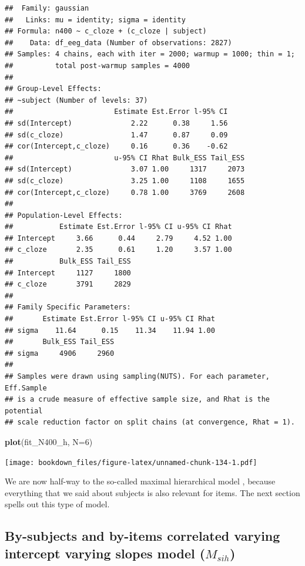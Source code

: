 \documentclass[12pt,]{krantz}
\newenvironment{Shaded}{\begin{snugshade}}{\end{snugshade}}
\newcommand{\DataTypeTok}[1]{\textcolor[rgb]{0.13,0.29,0.53}{#1}}
\newcommand{\DecValTok}[1]{\textcolor[rgb]{0.00,0.00,0.81}{#1}}
\newcommand{\KeywordTok}[1]{\textcolor[rgb]{0.13,0.29,0.53}{\textbf{#1}}}
\newcommand{\NormalTok}[1]{#1}
\theoremstyle{definition}
\theoremstyle{definition}
\theoremstyle{definition}
\theoremstyle{remark}
\begin{document}
\begin{verbatim}
##  Family: gaussian 
##   Links: mu = identity; sigma = identity 
## Formula: n400 ~ c_cloze + (c_cloze | subject) 
##    Data: df_eeg_data (Number of observations: 2827) 
## Samples: 4 chains, each with iter = 2000; warmup = 1000; thin = 1;
##          total post-warmup samples = 4000
## 
## Group-Level Effects: 
## ~subject (Number of levels: 37) 
##                        Estimate Est.Error l-95% CI
## sd(Intercept)              2.22      0.38     1.56
## sd(c_cloze)                1.47      0.87     0.09
## cor(Intercept,c_cloze)     0.16      0.36    -0.62
##                        u-95% CI Rhat Bulk_ESS Tail_ESS
## sd(Intercept)              3.07 1.00     1317     2073
## sd(c_cloze)                3.25 1.00     1108     1655
## cor(Intercept,c_cloze)     0.78 1.00     3769     2608
## 
## Population-Level Effects: 
##           Estimate Est.Error l-95% CI u-95% CI Rhat
## Intercept     3.66      0.44     2.79     4.52 1.00
## c_cloze       2.35      0.61     1.20     3.57 1.00
##           Bulk_ESS Tail_ESS
## Intercept     1127     1800
## c_cloze       3791     2829
## 
## Family Specific Parameters: 
##       Estimate Est.Error l-95% CI u-95% CI Rhat
## sigma    11.64      0.15    11.34    11.94 1.00
##       Bulk_ESS Tail_ESS
## sigma     4906     2960
## 
## Samples were drawn using sampling(NUTS). For each parameter, Eff.Sample 
## is a crude measure of effective sample size, and Rhat is the potential 
## scale reduction factor on split chains (at convergence, Rhat = 1).
\end{verbatim}

\begin{Shaded}
\begin{Highlighting}[]
\KeywordTok{plot}\NormalTok{(fit_N400_h, }\DataTypeTok{N=}\DecValTok{6}\NormalTok{)}
\end{Highlighting}
\end{Shaded}

\texttt{[image: bookdown\_files/figure-latex/unnamed-chunk-134-1.pdf]}

We are now half-way to the so-called maximal hierarchical model \citep{barr2013}, because everything that we said about subjects is also relevant for items. The next section spells out this type of model.

\hypertarget{sec:sih}{%
\subsection{\texorpdfstring{By-subjects and by-items correlated varying intercept varying slopes model (\(M_{sih}\))}{By-subjects and by-items correlated varying intercept varying slopes model (M\_\{sih\})}}\label{sec:sih}}
\end{document}
